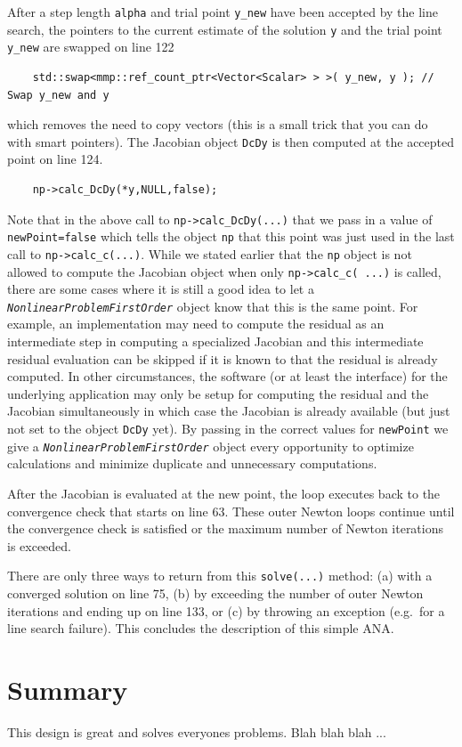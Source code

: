 After a step length \texttt{alpha} and trial point \texttt{y\_new}
have been accepted by the line search, the pointers to the current
estimate of the solution \texttt{y} and the trial point
\texttt{y\_new} are swapped on line 122
%
{\scriptsize\begin{verbatim}
    std::swap<mmp::ref_count_ptr<Vector<Scalar> > >( y_new, y ); // Swap y_new and y
\end{verbatim}}
%
\noindent{}which removes the need to copy vectors (this is a small trick that you
can do with smart pointers).  The Jacobian object \texttt{DcDy} is
then computed at the accepted point on line 124.
%
{\scriptsize\begin{verbatim}
    np->calc_DcDy(*y,NULL,false);
\end{verbatim}}
%
Note that in the above call to \texttt{np->calc\_DcDy(...)} that we
pass in a value of \texttt{newPoint=false} which tells the object
\texttt{np} that this point was just used in the last call to
\texttt{np->calc\_c(...)}.  While we stated earlier that the
\texttt{np} object is not allowed to compute the Jacobian object
when only \texttt{np->calc\_c( ...)} is called, there are some
cases where it is still a good idea to let a
\texttt{\textit{Nonlinear\-Problem\-First\-Order}} object know
that this is the same point.  For example, an implementation may need
to compute the residual as an intermediate step in computing a
specialized Jacobian and this intermediate residual evaluation can be
skipped if it is known to that the residual is already computed.  In
other circumstances, the software (or at least the interface) for the
underlying application may only be setup for computing the residual
and the Jacobian simultaneously in which case the Jacobian is already
available (but just not set to the object \texttt{DcDy} yet).  By
passing in the correct values for \texttt{newPoint} we give a
\texttt{\textit{Nonlinear\-Problem\-First\-Order}} object every
opportunity to optimize calculations and minimize duplicate and
unnecessary computations.

After the Jacobian is evaluated at the new point, the loop executes
back to the convergence check that starts on line 63.  These outer
Newton loops continue until the convergence check is satisfied or the
maximum number of Newton iterations is exceeded.

There are only three ways to return from this \texttt{solve(...)}
method: (a) with a converged solution on line 75, (b) by exceeding the
number of outer Newton iterations and ending up on line 133, or (c)
by throwing an exception (e.g.~for a line search failure).  This
concludes the description of this simple ANA.

%
\section{Summary}
%

This design is great and solves everyones problems.  Blah blah blah ...
